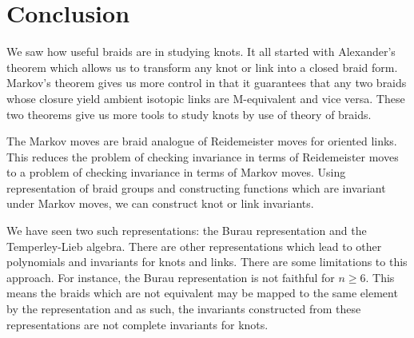 \chapter*{Conclusion}

We saw how useful braids are in studying knots. It all started with Alexander's theorem which allows us to transform any knot or link into a closed braid form. Markov's theorem gives us more control in that it guarantees that any two braids whose closure yield ambient isotopic links are M-equivalent and vice versa. These two theorems give us more tools to study knots by use of theory of braids.

The Markov moves are braid analogue of Reidemeister moves for oriented links. This reduces the problem of checking invariance in terms of Reidemeister moves to a problem of checking invariance in terms of Markov moves. Using representation of braid groups and constructing functions which are invariant under Markov moves, we can construct knot or link invariants.

We have seen two such representations: the Burau representation and the Temperley-Lieb algebra. There are other representations which lead to other polynomials and invariants for knots and links. There are some limitations to this approach. For instance, the Burau representation is not faithful for $n\geq 6$. This means the braids which are not equivalent may be mapped to the same element by the representation and as such, the invariants constructed from these representations are not complete invariants for knots.